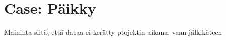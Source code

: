 
 \chapter{Case: Päikky}

Maininta siitä, että dataa ei kerätty ptojektin aikana, vaan jälkikäteen




